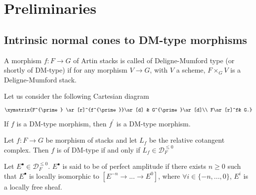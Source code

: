 \begin{theorem}\label{manolacheVirtualPullbacks2012-setup}
\end{theorem}

\section{Preliminaries}\label{manolacheVirtualPullbacks2012-sec-2}

\subsection{Intrinsic normal cones to DM-type morphisms}\label{manolacheVirtualPullbacks2012-sec-2.1}

\begin{definition}\label{manolacheVirtualPullbacks2012-def-2.1}
\label{manolacheVirtualPullbacks2012-dm}
 A morphism $f:F\to G$ of Artin stacks is called of Deligne-Mumford type (or shortly of DM-type) if for any morphism $V\to G$, with $V$ a scheme, $F\times_GV$ is a Deligne-Mumford stack.
\end{definition}

\begin{remark}\label{manolacheVirtualPullbacks2012-rem-2.2}
Let us consider the following Cartesian diagram
\begin{equation}
 \xymatrix {F^{\prime} \ar[r]^{f^{\prime}}\ar[d] & G^{\prime}\ar[d]\\
             F\ar[r]^f& G.}
\end{equation}
If $f$ is a DM-type morphism, then $f^{\prime}$ is a DM-type morphism.
\end{remark}

\begin{remark}\label{manolacheVirtualPullbacks2012-rem-2.3}
Let $f:F\to G$ be morphism of stacks and let $L_f$ be the relative cotangent complex. Then $f$ is of DM-type if and only if $L_f\in \mathcal{D}^{\leq0}_F$
\end{remark}

\begin{definition}\label{manolacheVirtualPullbacks2012-def-2.4}
Let $E^{\bullet}\in\mathcal{D}^{\leq0}_F$. $E^{\bullet}$ is said to be of perfect amplitude if there exists $n\geq0$ such that $E^{\bullet}$ is locally isomorphic to $[E^{-n}\to...\to E^{0}]$, where $\forall i\in\{-n,...,0\}$, $E^i$ is a locally free sheaf.
\end{definition}

